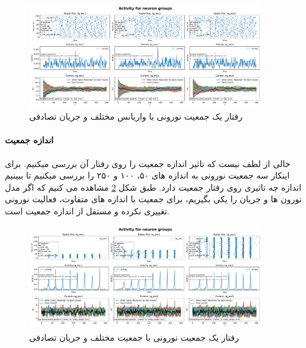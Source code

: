                 \begin{figure}[!ht]
                    \centering
                    \includegraphics[width=0.9\textwidth]{plots/part2-one-ng-full-synapse-diff-variance-rand-curr.pdf} 
                    \caption{رفتار یک جمعیت نورونی با واریانس مختلف و جریان تصادفی}
                    \label{fig:part2-one-ng-full-synapse-diff-variance-rand-curr}
                \end{figure}

            \paragraph*{اندازه جمعیت}
                خالی از لطف نیست که تاثیر اندازه جمعیت را روی رفتار آن بررسی میکنیم. برای اینکار سه جمعیت نورونی به اندازه های ۵۰، ۱۰۰ و ۲۵۰ را بررسی میکنیم تا ببینیم اندازه چه تاثیری روی رفتار جمعیت دارد. طبق شکل
                \ref{fig:part2-one-ng-full-synapse-diff-size}
                مشاهده می کنیم که اگر مدل نورون ها و جریان را یکی بگیریم، برای جمعیت با اندازه های متفاوت، فعالیت نورونی تغییری نکرده و مستقل از اندازه جمعیت است.
                \begin{figure}[!ht]
                    \centering
                    \includegraphics[width=0.9\textwidth]{plots/part2-one-ng-full-synapse-diff-size.pdf} 
                    \caption{رفتار یک جمعیت نورونی با جمعیت مختلف و جریان تصادفی}
                    \label{fig:part2-one-ng-full-synapse-diff-size}
                \end{figure}
